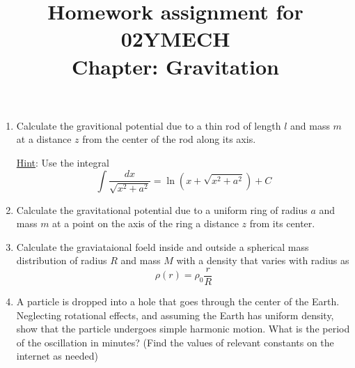 \documentclass[12pt]{article}
\title{Homework assignment for 02YMECH \\ Chapter: Gravitation}
\begin{document}
\date{}
\maketitle
\vspace{-0.8in}

\begin{enumerate}
    \item Calculate the gravitional potential due to a thin rod of length $l$ and mass $m$ at a distance $z$ from the center of the rod along its axis.

    \underline{Hint}: Use the integral
    \[\int \frac{dx}{\sqrt{x^2 + a^2}} = \ln\left(x + \sqrt{x^2 + a^2}\right) + C\]
    \item Calculate the gravitational potential due to a uniform ring of radius $a$ and mass $m$ at a point on the axis of the ring a distance $z$ from its center.
    \item Calculate the graviataional foeld inside and outside a spherical mass distribution of radius $R$ and mass $M$ with a density that varies with radius as
    \[\rho(r) = \rho_0 \frac{r}{R}\]
    \item A particle is dropped into a hole that goes through the center of the Earth. Neglecting rotational effects, and assuming the Earth has uniform density, show that the particle undergoes simple harmonic motion. What is the period of the oscillation in minutes? (Find the values of relevant constants on the internet as needed)
\end{enumerate}
\end{document}

